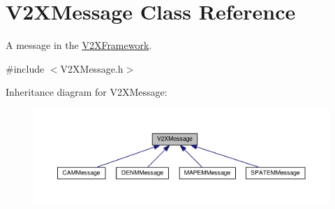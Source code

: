 \hypertarget{classV2XMessage}{}\section{V2\+X\+Message Class Reference}
\label{classV2XMessage}


A message in the \hyperlink{classV2XFramework}{V2\+X\+Framework}.  




{\ttfamily \#include $<$V2\+X\+Message.\+h$>$}



Inheritance diagram for V2\+X\+Message\+:\nopagebreak
\begin{figure}[H]
\begin{center}
\leavevmode
\includegraphics[width=350pt]{classV2XMessage__inherit__graph}
\end{center}
\end{figure}
